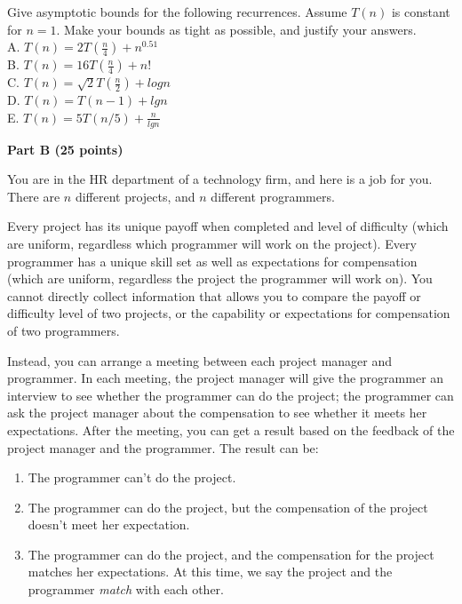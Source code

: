 \documentclass{article}
\begin{document}
\noindent Give asymptotic bounds for the following recurrences. Assume
$T(n)$ is constant for $n = 1$. Make your bounds as tight as possible,
and justify your answers.\\

\noindent A. $T(n) = 2T(\frac{n}{4}) + n^{0.51}$\\
\noindent B. $T(n) = 16 T(\frac{n}{4}) + n!$\\
\noindent C. $T(n) = \sqrt{2} T(\frac{n}{2}) + logn$\\
\noindent D. $T(n) = T(n-1) + lgn$\\
\noindent E. $T(n) = 5T(n/5) + \frac{n}{lgn}$\\

\begin{center}
{\bf Part B (25 points)}
\end{center}

 You are in the HR department of a
technology firm, and here is a job for you.  There are $n$ different
projects, and $n$ different programmers.

Every project has its unique payoff when completed and level of
difficulty (which are uniform, regardless which programmer will work
on the project).  Every programmer has a unique skill set as well as
expectations for compensation (which are uniform, regardless the
project the programmer will work on). You cannot directly collect
information that allows you to compare the payoff or difficulty level
of two projects, or the capability or expectations for compensation of
two programmers.

Instead, you can arrange a meeting between each project manager and
programmer.  In each meeting, the project manager will give the
programmer an interview to see whether the programmer can do the
project; the programmer can ask the project manager about the
compensation to see whether it meets her expectations.  After the
meeting, you can get a result based on the feedback of the project
manager and the programmer.  The result can be:

\begin{enumerate}
  \item The programmer can't do the project.
  \item The programmer can do the project, but the compensation of the
    project doesn't meet her expectation.
  \item The programmer can do the project, and the compensation for
    the project matches her expectations. At this time, we say the
    project and the programmer \textit{match} with each other.
\end{enumerate}
\end{document}
